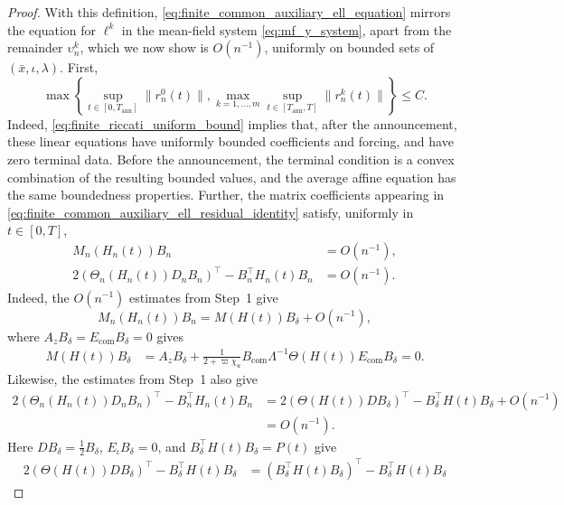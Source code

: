 \documentclass[12pt]{article}
\numberwithin{equation}{section}
\theoremstyle{definition}
\begin{document}
\begin{proof}
With this definition,
\eqref{eq:finite_common_auxiliary_ell_equation} mirrors the equation for
\(\ell^k\) in the mean-field system \eqref{eq:mf_y_system}, apart from the
remainder \(\upsilon_n^k\), which we now show is \(O(n^{-1})\), uniformly on
bounded sets of \((\bar x,\iota,\lambda)\). First,
\begin{equation}\label{eq:finite_common_affine_uniform_bound}
\max\left\{
\sup_{t\in[0,T_{\mathrm{ann}}]}\lVert r_n^0(t)\rVert,
\max_{k=1,\ldots,m}\sup_{t\in[T_{\mathrm{ann}},T]}
\lVert r_n^k(t)\rVert
\right\}
\leq
C.
\end{equation}
Indeed, \eqref{eq:finite_riccati_uniform_bound} implies that, after the
announcement, these linear equations have uniformly bounded coefficients and
forcing, and have zero terminal data. Before the announcement, the terminal
condition is a convex combination of the resulting bounded values, and the
average affine equation has the same boundedness properties.
Further, the matrix coefficients appearing in
\eqref{eq:finite_common_auxiliary_ell_residual_identity} satisfy, uniformly in
\(t\in[0,T]\),
\begin{equation}\label{eq:finite_common_residual_matrix_bounds}
\begin{aligned}
M_n(H_n(t))B_n
&=O(n^{-1}),
\\
2\left(
\Theta_n(H_n(t))D_nB_n
\right)^\top
-B_n^\top H_n(t)B_n
&=O(n^{-1}).
\end{aligned}
\end{equation}
Indeed, the \(O(n^{-1})\) estimates from Step~1 give
\[
M_n(H_n(t))B_n
=
M(H(t))B_\delta+O(n^{-1}),
\]
where \(A_zB_\delta=E_{\mathrm{com}}B_\delta=0\) gives
\[
\begin{aligned}
M(H(t))B_\delta
&=
A_zB_\delta
+\frac{1}{2+\varpi\chi_u}
B_{\mathrm{com}}\Lambda^{-1}
\Theta(H(t))E_{\mathrm{com}}B_\delta
=0.
\end{aligned}
\]
Likewise, the estimates from Step~1 also give
\[
\begin{aligned}
2\left(
\Theta_n(H_n(t))D_nB_n
\right)^\top
-B_n^\top H_n(t)B_n
&=
2\left(
\Theta(H(t))DB_\delta
\right)^\top
-B_\delta^\top H(t)B_\delta
+O(n^{-1})\\
&=O(n^{-1}).
\end{aligned}
\]
Here \(DB_\delta=\frac12B_\delta\),
\(E_\iota B_\delta=0\), and
\(B_\delta^\top H(t)B_\delta=P(t)\) give
\[
\begin{aligned}
2\left(
\Theta(H(t))DB_\delta
\right)^\top
-B_\delta^\top H(t)B_\delta
&=
\left(
B_\delta^\top H(t)B_\delta
\right)^\top
-B_\delta^\top H(t)B_\delta

\end{aligned}\]
\end{proof}
\end{document}
